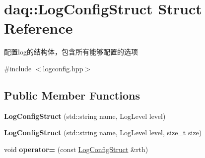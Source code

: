 \hypertarget{structdaq_1_1LogConfigStruct}{}\section{daq\+:\+:Log\+Config\+Struct Struct Reference}
\label{structdaq_1_1LogConfigStruct}


配置log的结构体，包含所有能够配置的选项  




{\ttfamily \#include $<$logconfig.\+hpp$>$}

\subsection*{Public Member Functions}
\begin{DoxyCompactItemize}
\item 
\mbox{\label{structdaq_1_1LogConfigStruct_a644278faae9f113b2668ef075bb9c154}} 
{\bfseries Log\+Config\+Struct} (std\+::string name, Log\+Level level)
\item 
\mbox{\label{structdaq_1_1LogConfigStruct_a65c881154642ad9d4291f3be356aaa2c}} 
{\bfseries Log\+Config\+Struct} (std\+::string name, Log\+Level level, size\+\_\+t size)
\item 
\mbox{\label{structdaq_1_1LogConfigStruct_ab137ec2e23fda6ff0873c24f2807e7ee}} 
void {\bfseries operator=} (const \hyperlink{structdaq_1_1LogConfigStruct}{Log\+Config\+Struct} \&rth)
\end{DoxyCompactItemize}

